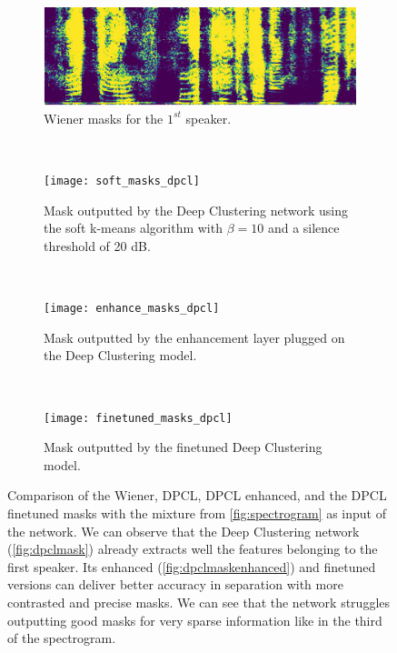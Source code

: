 \documentclass[master, tikz, final,11pt, dvipdfmx]{iscs-thesis}
\begin{document}
\begin{figure}[h!]
\centering
\begin{subfigure}[b]{0.8\textwidth}
\includegraphics[width=\textwidth]{wf2}
\caption{Wiener masks for the $1^{st}$ speaker.}
\label{fig:wfdp} 
\end{subfigure}
\\\begin{subfigure}[b]{0.8\textwidth}
\texttt{[image: soft\_masks\_dpcl]}
\captionsetup{justification=centering}
\caption{Mask outputted by the Deep Clustering network using the soft k-means algorithm with $\beta=10$ and a silence threshold of 20 dB.}
\label{fig:dpclmask} 
\end{subfigure}
\\
\begin{subfigure}[b]{0.8\textwidth}
\texttt{[image: enhance\_masks\_dpcl]}
\captionsetup{justification=centering}
\caption{Mask outputted by the enhancement layer plugged on the Deep Clustering model.}
\label{fig:dpclmaskenhanced} 
\end{subfigure}
\\
\begin{subfigure}[b]{0.8\textwidth}
\texttt{[image: finetuned\_masks\_dpcl]}
\captionsetup{justification=centering}
\caption{Mask outputted by the finetuned Deep Clustering model.}
\label{fig:dpclmaskenhanced} 
\end{subfigure}
\caption[Comparison of the Wiener, DPCL, DPCL enhanced, and the DPCL finetuned masks]{Comparison of the Wiener, DPCL, DPCL enhanced, and the DPCL finetuned masks with the mixture from \autoref{fig:spectrogram} as input of the network. We can observe that the Deep Clustering network (\autoref{fig:dpclmask}) already extracts well the features belonging to the first speaker. Its enhanced  (\autoref{fig:dpclmaskenhanced}) and finetuned versions can deliver better accuracy in separation with more contrasted and precise masks. We can see that the network struggles outputting good masks for very sparse information like in the third of the spectrogram.}
\label{fig:maskdpcl} 

\end{figure}
\end{document}
